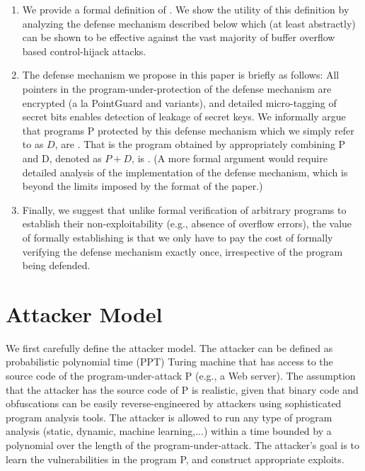 \begin{enumerate}

\item We provide a formal definition of \resistance. We show the
  utility of this definition by analyzing the defense mechanism
  described below which (at least abstractly) can be shown to be
  effective against the vast majority of buffer overflow based
  control-hijack attacks.

\item The defense mechanism we propose in this paper is briefly as
  follows: All pointers in the program-under-protection of the defense
  mechanism are encrypted (a la PointGuard and variants), and detailed
  micro-tagging of secret bits enables detection of leakage of secret
  keys. We informally argue that programs P protected by this defense
  mechanism which we simply refer to as $D$, are \resistant. That is
  the program obtained by appropriately combining P and D, denoted as
  $P+D$, is \resistant. (A more formal argument would require detailed
  analysis of the implementation of the defense mechanism, which is
  beyond the limits imposed by the format of the paper.)

\item Finally, we suggest that unlike formal verification of arbitrary
  programs to establish their non-exploitability (e.g., absence of
  overflow errors), the value of formally establishing \resistance is
  that we only have to pay the cost of formally verifying the defense
  mechanism exactly once, irrespective of the program being defended.

\end{enumerate}

\section{Attacker Model}

We first carefully define the attacker model. The attacker can be
defined as probabilistic polynomial time (PPT) Turing machine that has
access to the source code of the program-under-attack P (e.g., a Web
server). The assumption that the attacker has the source code of P is
realistic, given that binary code and obfuscations can be easily
reverse-engineered by attackers using sophisticated program analysis
tools. The attacker is allowed to run any type of program analysis
(static, dynamic, machine learning,...)  within a time bounded by a
polynomial over the length of the program-under-attack. The attacker's
goal is to learn the vulnerabilities in the program P, and construct
appropriate exploits.

